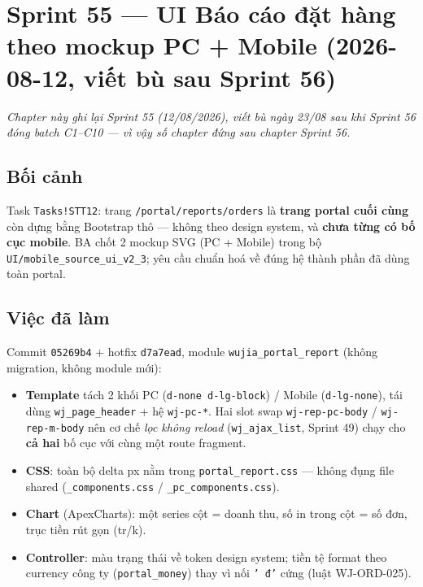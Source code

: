 \chapter{Sprint 55 --- UI Báo cáo đặt hàng theo mockup PC + Mobile (2026-08-12, viết bù sau Sprint 56)}

\emph{Chapter này ghi lại Sprint 55 (12/08/2026), viết bù ngày 23/08 sau khi Sprint 56
đóng batch C1--C10 --- vì vậy số chapter đứng sau chapter Sprint 56.}

\section{Bối cảnh}

Task \texttt{Tasks!STT12}: trang \texttt{/portal/reports/orders} là \textbf{trang portal
cuối cùng} còn dựng bằng Bootstrap thô --- không theo design system, và \textbf{chưa từng có
bố cục mobile}. BA chốt 2 mockup SVG (PC + Mobile) trong bộ
\texttt{UI/mobile\_source\_ui\_v2\_3}; yêu cầu chuẩn hoá về đúng hệ thành phần đã dùng toàn
portal.

\section{Việc đã làm}

Commit \texttt{05269b4} + hotfix \texttt{d7a7ead}, module \texttt{wujia\_portal\_report}
(không migration, không module mới):

\begin{itemize}
\item \textbf{Template} tách 2 khối PC (\texttt{d-none d-lg-block}) / Mobile
  (\texttt{d-lg-none}), tái dùng \texttt{wj\_page\_header} + hệ \texttt{wj-pc-*}. Hai slot
  swap \texttt{wj-rep-pc-body} / \texttt{wj-rep-m-body} nên cơ chế \emph{lọc không reload}
  (\texttt{wj\_ajax\_list}, Sprint 49) chạy cho \textbf{cả hai} bố cục với cùng một route
  fragment.
\item \textbf{CSS}: toàn bộ delta px nằm trong \texttt{portal\_report.css} --- không đụng
  file shared (\texttt{\_components.css} / \texttt{\_pc\_components.css}).
\item \textbf{Chart} (ApexCharts): một series cột = doanh thu, số in trong cột = số đơn,
  trục tiền rút gọn (tr/k).
\item \textbf{Controller}: màu trạng thái về token design system; tiền tệ format theo
  currency công ty (\texttt{portal\_money}) thay vì nối \texttt{' đ'} cứng (luật WJ-ORD-025).
\end{itemize}

